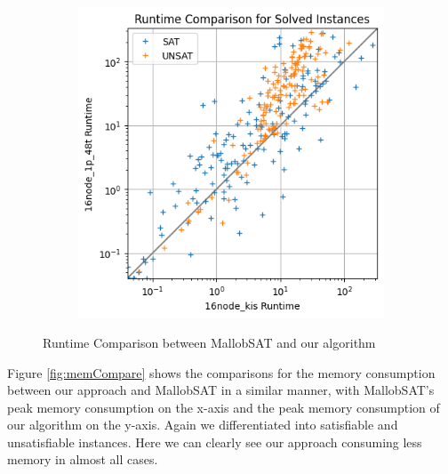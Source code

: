 \documentclass[12pt,a4paper,twoside]{scrartcl}
\numberwithin{equation}{section}
\begin{document}
\begin{figure}
\begin{subfigure}[c]{.4\textwidth}
    \label{fig:runtimeCompare4node}
  \end{subfigure}
  \begin{subfigure}[c]{.4\textwidth}
    \center
    \includegraphics[scale=.5]{plots/square_runtime_compare/square_runtime_16node.png}
    \label{fig:runtimeCompare16node}
  \end{subfigure}
  \caption{Runtime Comparison between MallobSAT and our algorithm}
  \label{fig:runtimeCompare}
\end{figure}

Figure \ref{fig:memCompare} shows the comparisons for the memory consumption between our approach and MallobSAT in a similar manner, with MallobSAT's peak memory consumption on the x-axis and the peak memory consumption of our algorithm on the y-axis. Again we differentiated into satisfiable and unsatisfiable instances. Here we can clearly see our approach consuming less memory in almost all cases.
\end{document}
